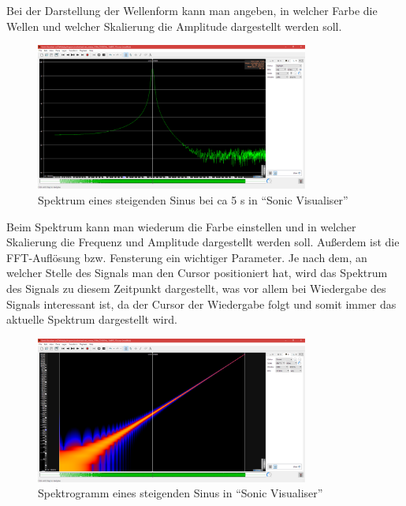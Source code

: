 \documentclass[a4paper]{article}
\begin{document}
\noindent
Bei der Darstellung der Wellenform kann man angeben, in welcher Farbe die Wellen und welcher Skalierung die Amplitude dargestellt werden soll.
\vspace{2em}
\begin{figure}[H]
    \centering
    \begin{minipage}{1.0\textwidth}
        \centering
        \includegraphics[width=0.8\textwidth]{Sonic_Sine_Sweep_Spectrum_on_5s.png}
        \caption{Spektrum eines steigenden Sinus bei ca 5 s in "`Sonic Visualiser"'}
    \end{minipage}
\end{figure}
\noindent
Beim Spektrum kann man wiederum die Farbe einstellen und in welcher Skalierung die Frequenz und Amplitude dargestellt werden soll. Außerdem ist die FFT-Auflösung bzw. Fensterung ein wichtiger Parameter. Je nach dem, an welcher Stelle des Signals man den Cursor positioniert hat, wird das Spektrum des Signals zu diesem Zeitpunkt dargestellt, was vor allem bei Wiedergabe des Signals interessant ist, da der Cursor der Wiedergabe folgt und somit immer das aktuelle Spektrum dargestellt wird.
\vspace{2em}
\begin{figure}[H]
    \centering
    \begin{minipage}{1.0\textwidth}
        \centering
        \includegraphics[width=0.8\textwidth]{Sonic_Sine_Sweep_Spectrogram.png}
        \caption{Spektrogramm eines steigenden Sinus in "`Sonic Visualiser"'}
    \end{minipage}
\end{figure}
\end{document}
